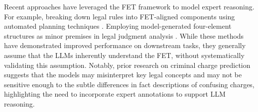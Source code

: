 Recent approaches have leveraged the FET framework to model expert reasoning. For example, breaking down legal rules into FET-aligned components using automated planning techniques \cite{yuan2024can}. Employing model-generated four-element structures as minor premises in legal judgment analysis \cite{deng2023syllogistic}. While these methods have demonstrated improved performance on downstream tasks, they generally assume that the LLMs inherently understand the FET, without systematically validating this assumption. Notably, prior research on criminal charge prediction \cite{an2022charge} suggests that the models may misinterpret key legal concepts and may not be sensitive enough to the subtle differences in fact descriptions of confusing charges, highlighting the need to incorporate expert annotations to support LLM reasoning.